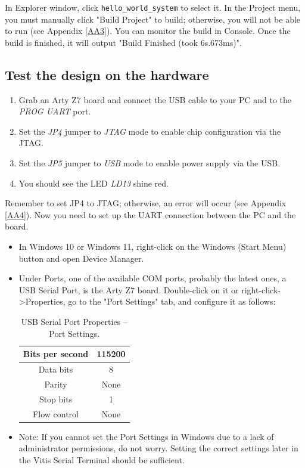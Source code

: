 \documentclass[a4paper,12pt,twoside]{article}
\begin{document}
In Explorer window, click \texttt{hello\_world\_system} to select it. In the Project menu, you must manually click "Build Project" to build; otherwise, you will not be able to run (see Appendix \ref{AA3}). You can monitor the build in Console. Once the build is finished, it will output "Build Finished (took 6s.673ms)".
\subsection{Test the design on the hardware}
\begin{enumerate}
    \item Grab an Arty Z7 board and connect the USB cable to your PC and to the \textit{PROG UART} port.
    \item Set the \textit{JP4} jumper to \textit{JTAG} mode to enable chip configuration via the JTAG.
    \item Set the \textit{JP5} jumper to \textit{USB} mode to enable power supply via the USB.
    \item You should see the LED \textit{LD13} shine red.
\end{enumerate}
Remember to set JP4 to JTAG; otherwise, an error will occur (see Appendix \ref{AA4}). Now you need to set up the UART connection between the PC and the board.
\begin{itemize}
    \item In Windows 10 or Windows 11, right-click on the Windows (Start Menu) button and open Device Manager.
    \item Under Ports, one of the available COM ports, probably the latest ones, a USB Serial Port, is the Arty Z7 board. Double-click on it or right-click->Properties, go to the "Port Settings" tab, and configure it as follows:
    \begin{table}[H]
        \centering
        \begin{tabular}{|c|c|}
            \hline
            Bits per second&115200\\
            \hline
            Data bits&8\\
            \hline
            Parity&None\\
            \hline
            Stop bits&1\\
            \hline
            Flow control&None\\
            \hline
        \end{tabular}
        \caption{USB Serial Port Properties -- Port Settings.}
    \end{table}
    \item Note: If you cannot set the Port Settings in Windows due to a lack of administrator permissions, do not worry. Setting the correct settings later in the Vitis Serial Terminal should be sufficient.
\end{itemize}
\end{document}

